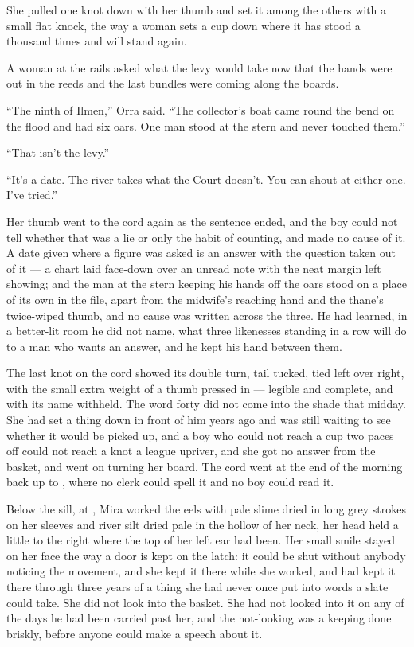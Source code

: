 She pulled one knot down with her thumb and set it among the others with a small flat knock, the way a woman sets a cup down where it has stood a thousand times and will stand again.

A woman at the rails asked what the levy would take now that the hands were out in the reeds and the last bundles were coming along the boards.

“The ninth of Ilmen,” Orra said. “The collector's boat came round the bend on the flood and had six oars. One man stood at the stern and never touched them.”

“That isn't the levy.”

“It's a date. The river takes what the Court doesn't. You can shout at either one. I've tried.”

Her thumb went to the cord again as the sentence ended, and the boy could not tell whether that was a lie or only the habit of counting, and made no cause of it. A date given where a figure was asked is an answer with the question taken out of it --- a chart laid face-down over an unread note with the neat margin left showing; and the man at the stern keeping his hands off the oars stood on a place of its own in the file, apart from the midwife's reaching hand and the thane's twice-wiped thumb, and no cause was written across the three. He had learned, in a better-lit room he did not name, what three likenesses standing in a row will do to a man who wants an answer, and he kept his hand between them.

The last knot on the cord showed its double turn, tail tucked, tied left over right, with the small extra weight of a thumb pressed in --- legible and complete, and with its name withheld. The word forty did not come into the shade that midday. She had set a thing down in front of him years ago and was still waiting to see whether it would be picked up, and a boy who could not reach a cup two paces off could not reach a knot a league upriver, and she got no answer from the basket, and went on turning her board. The cord went at the end of the morning back up to , where no clerk could spell it and no boy could read it.

\scenebreak

Below the sill, at , Mira worked the eels with pale slime dried in long grey strokes on her sleeves and river silt dried pale in the hollow of her neck, her head held a little to the right where the top of her left ear had been. Her small smile stayed on her face the way a door is kept on the latch: it could be shut without anybody noticing the movement, and she kept it there while she worked, and had kept it there through three years of a thing she had never once put into words a slate could take. She did not look into the basket. She had not looked into it on any of the days he had been carried past her, and the not-looking was a keeping done briskly, before anyone could make a speech about it.

